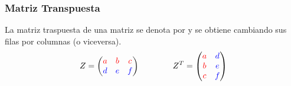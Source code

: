 \documentclass[stu, 12pt, letterpaper, donotrepeattitle, floatsintext, natbib]{apa7}
\begin{document}
\subsubsection{Matriz Transpuesta}
La matriz traspuesta de una matriz se denota por y se obtiene cambiando sus filas por columnas (o viceversa).
\[
Z =
\begin{pmatrix}
\color{red} a &\color{red} b & \color{red}c \\
\color{blue} d & \color{blue}e & \color{blue}f 
\end{pmatrix}
\qquad \qquad
Z^T =
\begin{pmatrix}
\color{red}a & \color{blue}d \\ 
\color{red}b & \color{blue}e \\
\color{red}c & \color{blue}f \\
\end{pmatrix}
\]
\end{document}
